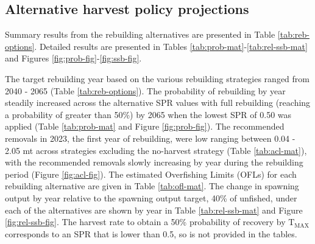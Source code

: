 \documentclass[11pt,
  english,
  letterpaper,
]{article}
\begin{document}
\leavevmode\tagmcend\tagstructend\par


\hypertarget{alternative-harvest-policy-projections}{%
\subsection{Alternative harvest policy projections}\label{alternative-harvest-policy-projections}}

\leavevmode\tagmcend\tagstructend


Summary results from the rebuilding alternatives are presented in Table \ref{tab:reb-options}. Detailed results are presented in Tables \ref{tab:prob-mat}-\ref{tab:rel-ssb-mat} and Figures \ref{fig:prob-fig}-\ref{fig:ssb-fig}.

\leavevmode\tagmcend\tagstructend\par


The target rebuilding year based on the various rebuilding strategies ranged from 2040 - 2065 (Table \ref{tab:reb-options}). The probability of rebuilding by year steadily increased across the alternative SPR values with full rebuilding (reaching a probability of greater than 50\%) by 2065 when the lowest SPR of 0.50 was applied (Table \ref{tab:prob-mat} and Figure \ref{fig:prob-fig}). The recommended removals in 2023, the first year of rebuilding, were low ranging between 0.04 - 2.05 mt across strategies excluding the no-harvest strategy (Table \ref{tab:acl-mat}), with the recommended removals slowly increasing by year during the rebuilding period (Figure \ref{fig:acl-fig}). The estimated Overfishing Limits (OFLs) for each rebuilding alternative are given in Table \ref{tab:ofl-mat}. The change in spawning output by year relative to the spawning output target, 40\% of unfished, under each of the alternatives are shown by year in Table \ref{tab:rel-ssb-mat} and Figure \ref{fig:rel-ssb-fig}. The harvest rate to obtain a 50\% probability of recovery by {\(\text{T}_\text{MAX}\)\leavevmode\tagmcend\tagstructend} corresponds to an SPR that is lower than 0.5, so is not provided in the tables.

\leavevmode\tagmcend\tagstructend\par
\end{document}
